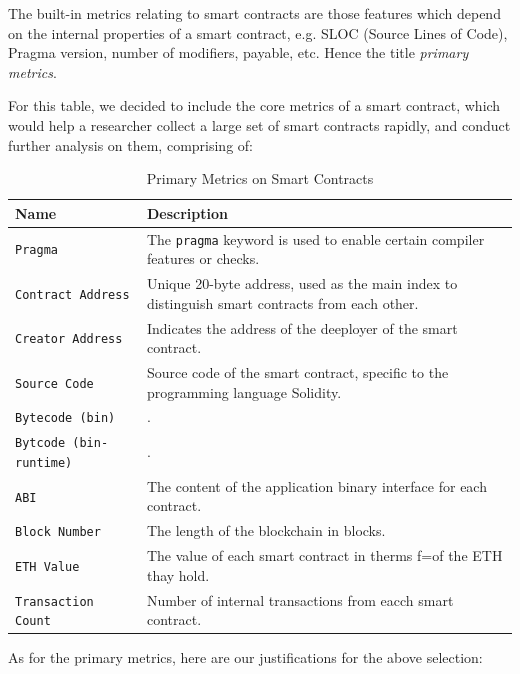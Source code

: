 		The built-in metrics relating to smart contracts are those features which depend on the internal properties of a smart contract, e.g. SLOC (Source Lines of Code), Pragma version, number of modifiers, payable, etc. Hence the title \emph{primary metrics}.

		For this table, we decided to include the core metrics of a smart contract, which would help a researcher collect a large set of smart contracts rapidly, and conduct further analysis on them, comprising of:

		\begin{table}[H]
			\caption{Primary Metrics on Smart Contracts}
			\label{tab:intrinsic-cues}
			\centering
			\begin{adjustbox}{width=1\textwidth}
			\def\arraystretch{1.3}
			\begin{tabular}{l|p{105mm}}
				\textbf{Name} & \textbf{Description} \\
				\hline
				\verb|Pragma| & The \verb|pragma| keyword is used to enable certain compiler features or checks.\\
				\verb|Contract Address| & Unique 20-byte address, used as the main index to distinguish smart contracts from each other. \\
				\verb|Creator Address| & Indicates the address of the deeployer of the smart contract. \\
				\verb|Source Code| & Source code of the smart contract, specific to the programming language Solidity. \\
				\verb|Bytecode (bin)| & . \\
				\verb|Bytcode (bin-runtime)| & . \\
				\verb|ABI| & The content of the application binary interface for each contract. \\
				\verb|Block Number| & The length of the blockchain in blocks. \\
				\verb|ETH Value| & The value of each smart contract in therms f=of the ETH thay hold. \\
				\verb|Transaction Count| & Number of internal transactions from eacch smart contract. \\
			\end{tabular}
			\end{adjustbox}
	\end{table}

	As for the primary metrics, here are our justifications for the above selection:

